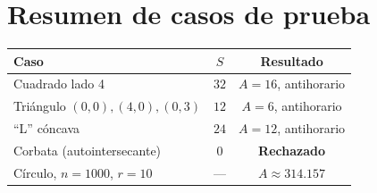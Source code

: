 ﻿\documentclass[11pt,a4paper]{article}
\begin{document}
\section{Resumen de casos de prueba}
\begin{center}
\begin{tabular}{@{}lcc@{}}
\toprule
Caso & $S$ & Resultado\\
\midrule
Cuadrado lado 4 & $32$ & $A=16$, antihorario\\
Tri\'angulo $(0,0),(4,0),(0,3)$ & $12$ & $A=6$, antihorario\\
``L'' c\'oncava & $24$ & $A=12$, antihorario\\
Corbata (autointersecante) & $0$ & \textbf{Rechazado}\\
C\'irculo, $n=1000$, $r=10$ & --- & $A\approx314.157$\\
\bottomrule
\end{tabular}
\end{center}
\end{document}

